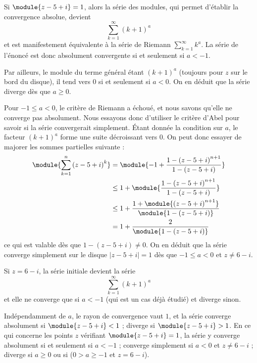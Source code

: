 \documentclass[12pt,french,oneside,a4paper]{memoir} %
\begin{document}
\begin{exo}
\begin{correction}
\begin{enumerate}
Si $\module{z - 5 + i} = 1$, alors la série des modules, qui permet
d'établir la convergence absolue, devient
\begin{equation*}
\sum_{k=1}^\infty (k+1)^a
\end{equation*}
et est manifestement équivalente à la série de Riemann $\sum_{k=1}^\infty k^a$. La série de l'énoncé est donc absolument convergente si et seulement si $a < -1$.

Par ailleurs, le module du terme général étant ${(k+1)}^a$ (toujours pour $z$ sur le bord du disque), il tend vers $0$ si et seulement si $a < 0$. On en déduit que la série diverge dès que $a\geq 0$.

Pour $-1 \leq a < 0$, le \og critère de Riemann\fg{} a échoué, et nous savons qu'elle ne converge pas absolument. Nous essayons donc d'utiliser le critère d'Abel pour savoir si la série convergerait simplement. Étant donnée la condition sur $a$, le facteur ${(k+1)}^a$ forme une suite décroissant vers $0$. On peut donc essayer de majorer les sommes partielles suivante :
\begin{equation*}
\begin{split}
\module{\sum_{k=1}^n {(z- 5 + i)}^k} &= \module{-1 + \frac{1 -
{(z- 5 + i)}^{n+1}}{1 - (z - 5 + i)}} \\
&\leq 1+ \module{\frac{1 -
{(z- 5 + i)}^{n+1}}{1 - (z - 5 + i)}} \\
&\leq 1 + \frac{1 + \module{{(z - 5 + i)}^{n+1}}}{\module{1 - (z
- 5 + i)}}\\
&= 1 + \frac2{\module{1 - (z - 5 + i)}}
\end{split}
\end{equation*}
ce qui est valable dès que $1 - (z - 5 + i) \neq 0$. On en déduit que la série converge simplement sur le disque $| z-5+i |=1$ dès que $-1\leq a < 0$ et $z \neq 6-i$.

Si $z = 6 - i$, la série initiale devient la série
\begin{equation*}
	\sum_{k=1}^\infty {(k+1)}^a
\end{equation*}
et elle ne converge que si $a < -1$ (qui est un cas déjà étudié) et
diverge sinon.

\conclusion Indépendamment de $a$, le rayon de convergence vaut $1$, et la série converge absolument si $\module{z - 5 + i}<1$ ; diverge si $\module{z - 5 + i}>1$. En ce qui concerne les points $z$ vérifiant $\module{z - 5 + i}=1$, la série y converge absolument si et seulement si $a < -1$ ; converge simplement si $a < 0$ et $z \neq 6-i$ ; diverge si $a \geq 0$ ou si ($0 > a \geq -1$ et $z = 6-i$).


\end{enumerate}
\end{correction}
\end{exo}
\end{document}
